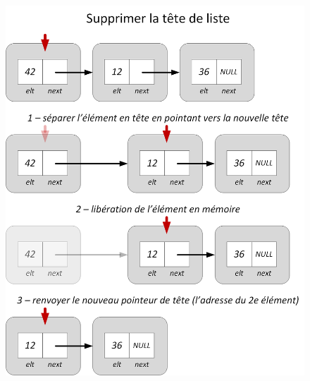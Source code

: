 \documentclass[11pt,a4paper]{article}
\begin{document}
\begin{figure}[ht!]
\centering
\centerline{   %
\includegraphics[scale=0.85]{img/listes/Listes_Pointeurs_4_2_suppression_tete.png}
}
\end{figure}

\vfillLast

\pagebreak

\vfillFirst
\end{document}
